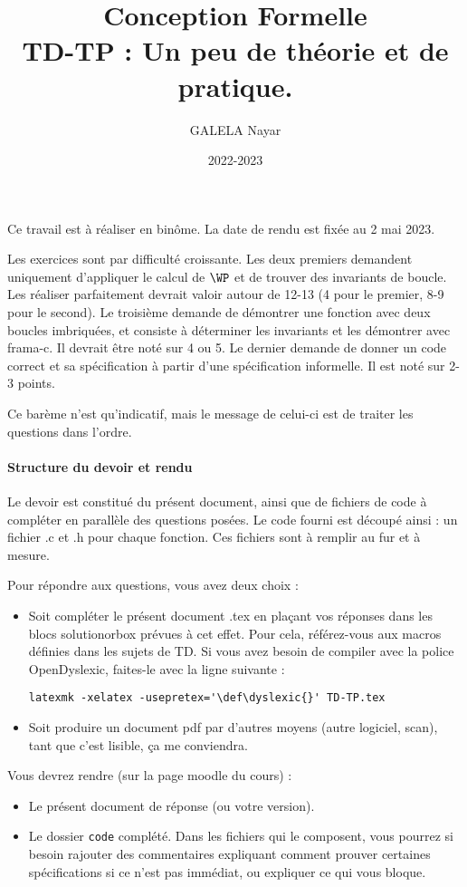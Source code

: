 \documentclass[11pt,answers]{exam}
\author{GALELA Nayar}
\date{2022-2023}
\title{{\bf Conception Formelle} \\ TD-TP : Un peu de théorie et de pratique.}
\begin{document}
\maketitle

Ce travail est à réaliser en binôme. La date de rendu est fixée au 2 mai 2023.


Les exercices sont par difficulté croissante. Les deux premiers demandent uniquement d’appliquer le calcul de $\WP$ et de trouver des invariants de boucle.
Les réaliser parfaitement devrait valoir autour de 12-13 (4 pour le premier, 8-9 pour le second).
Le troisième demande de démontrer une fonction avec deux boucles imbriquées, et consiste à déterminer les invariants et les démontrer avec frama-c. Il devrait être noté sur 4 ou 5.
Le dernier demande de donner un code correct et sa spécification à partir d’une spécification informelle. Il est noté sur 2-3 points.

Ce barème n’est qu’indicatif, mais le message de celui-ci est de traiter les questions dans l’ordre.

\paragraph{Structure du devoir et rendu}

Le devoir est constitué du présent document, ainsi que de fichiers de code à compléter en parallèle des questions posées.
Le code fourni est découpé ainsi : un fichier .c et .h pour chaque fonction.
Ces fichiers sont à remplir au fur et à mesure.

Pour répondre aux questions, vous avez deux choix :
\begin{itemize}
    \item Soit compléter le présent document .tex en plaçant vos réponses dans les blocs solutionorbox prévues à cet effet. Pour cela, référez-vous aux macros définies dans les sujets de TD. Si vous avez besoin de compiler avec la police OpenDyslexic, faites-le avec la ligne suivante : 
    
    \verb#latexmk -xelatex -usepretex='\def\dyslexic{}' TD-TP.tex#
    \item Soit produire un document pdf par d’autres moyens (autre logiciel, scan), tant que c’est lisible, ça me conviendra.
\end{itemize}

Vous devrez rendre (sur la page moodle du cours) :
\begin{itemize}
    \item Le présent document de réponse (ou votre version).
    \item Le dossier \texttt{code} complété. Dans les fichiers qui le composent, vous pourrez si besoin rajouter des commentaires expliquant comment prouver certaines spécifications si ce n’est pas immédiat, ou expliquer ce qui vous bloque.
\end{itemize}
\end{document}
